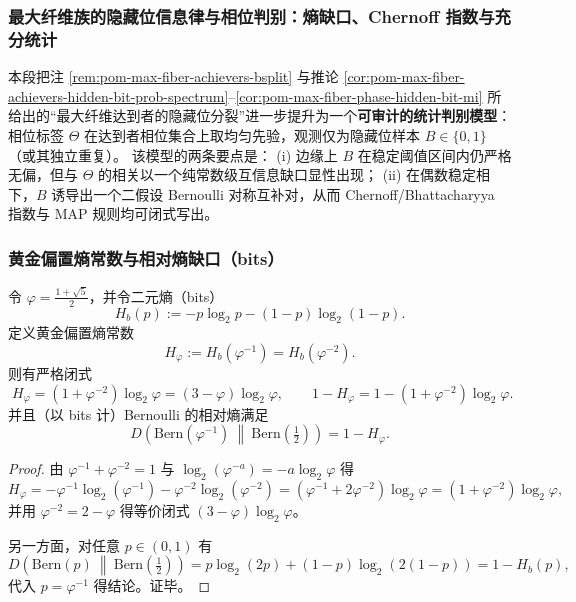 \subsubsection{最大纤维族的隐藏位信息律与相位判别：熵缺口、Chernoff 指数与充分统计}\label{subsubsec:pom-max-fiber-hidden-bit-phase-inference}

本段把注 \ref{rem:pom-max-fiber-achievers-bsplit} 与推论
\ref{cor:pom-max-fiber-achievers-hidden-bit-prob-spectrum}--\ref{cor:pom-max-fiber-phase-hidden-bit-mi}
所给出的“最大纤维达到者的隐藏位分裂”进一步提升为一个\textbf{可审计的统计判别模型}：
相位标签 \(\Theta\) 在达到者相位集合上取均匀先验，观测仅为隐藏位样本 \(B\in\{0,1\}\)（或其独立重复）。
该模型的两条要点是：
(i) 边缘上 \(B\) 在稳定阈值区间内仍严格无偏，但与 \(\Theta\) 的相关以一个纯常数级互信息缺口显性出现；
(ii) 在偶数稳定相下，\(B\) 诱导出一个二假设 Bernoulli 对称互补对，从而 Chernoff/Bhattacharyya 指数与 MAP 规则均可闭式写出。

\subsubsection{黄金偏置熵常数与相对熵缺口（bits）}

\begin{proposition}[黄金偏置熵常数的闭式与相对熵缺口]\label{prop:pom-max-fiber-hphi-relative-entropy-gap}
令 \(\varphi=\frac{1+\sqrt5}{2}\)，并令二元熵（bits）
\[
H_b(p):=-p\log_2 p-(1-p)\log_2(1-p).
\]
定义黄金偏置熵常数
\[
H_\varphi:=H_b(\varphi^{-1})=H_b(\varphi^{-2}).
\]
则有严格闭式
\[
\boxed{\;
H_\varphi=(1+\varphi^{-2})\log_2\varphi=(3-\varphi)\log_2\varphi,\qquad
1-H_\varphi=1-(1+\varphi^{-2})\log_2\varphi.\;}
\]
并且（以 bits 计）Bernoulli 的相对熵满足
\[
\boxed{\;
D\!\left(\mathrm{Bern}(\varphi^{-1})\ \middle\|\ \mathrm{Bern}\!\left(\tfrac12\right)\right)=1-H_\varphi.\;}
\]
\end{proposition}

\begin{proof}
由 \(\varphi^{-1}+\varphi^{-2}=1\) 与 \(\log_2(\varphi^{-a})=-a\log_2\varphi\) 得
\[
H_\varphi
=-\varphi^{-1}\log_2(\varphi^{-1})-\varphi^{-2}\log_2(\varphi^{-2})
=(\varphi^{-1}+2\varphi^{-2})\log_2\varphi
=(1+\varphi^{-2})\log_2\varphi,
\]
并用 \(\varphi^{-2}=2-\varphi\) 得等价闭式 \((3-\varphi)\log_2\varphi\)。
\par
另一方面，对任意 \(p\in(0,1)\) 有
\[
D\!\left(\mathrm{Bern}(p)\ \middle\|\ \mathrm{Bern}\!\left(\tfrac12\right)\right)
=p\log_2(2p)+(1-p)\log_2(2(1-p))
=1-H_b(p),
\]
代入 \(p=\varphi^{-1}\) 得结论。证毕。
\end{proof}

